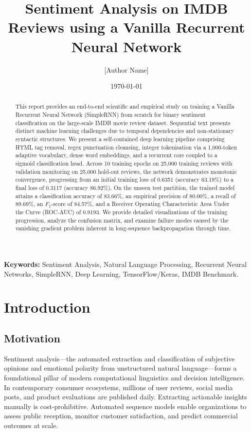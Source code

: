 \documentclass[11pt,a4paper]{article}
\title{\textbf{Sentiment Analysis on IMDB Reviews using a Vanilla Recurrent Neural Network}}
\author{[Author Name]}
\date{\today}
\begin{document}
\maketitle

\begin{abstract}
This report provides an end-to-end scientific and empirical study on training a Vanilla Recurrent Neural Network (SimpleRNN) from scratch for binary sentiment classification on the large-scale IMDB movie review dataset. Sequential text presents distinct machine learning challenges due to temporal dependencies and non-stationary syntactic structures. We present a self-contained deep learning pipeline comprising HTML tag removal, regex punctuation cleansing, integer tokenisation via a 1,000-token adaptive vocabulary, dense word embeddings, and a recurrent core coupled to a sigmoid classification head. Across 10 training epochs on 25,000 training reviews with validation monitoring on 25,000 hold-out reviews, the network demonstrates monotonic convergence, progressing from an initial training loss of 0.6351 (accuracy 63.19\%) to a final loss of 0.3117 (accuracy 86.92\%). On the unseen test partition, the trained model attains a classification accuracy of 83.66\%, an empirical precision of 80.00\%, a recall of 89.69\%, an $F_1$-score of 84.57\%, and a Receiver Operating Characteristic Area Under the Curve (ROC-AUC) of 0.9193. We provide detailed visualizations of the training progression, analyze the confusion matrix, and examine failure modes caused by the vanishing gradient problem inherent in long-sequence backpropagation through time.
\end{abstract}

\vspace{0.5em}
\noindent\textbf{Keywords:} Sentiment Analysis, Natural Language Processing, Recurrent Neural Networks, SimpleRNN, Deep Learning, TensorFlow/Keras, IMDB Benchmark.

\newpage
\tableofcontents
\newpage

\section{Introduction}

\subsection{Motivation}
Sentiment analysis—the automated extraction and classification of subjective opinions and emotional polarity from unstructured natural language—forms a foundational pillar of modern computational linguistics and decision intelligence. In contemporary consumer ecosystems, millions of user reviews, social media posts, and product evaluations are published daily. Extracting actionable insights manually is cost-prohibitive. Automated sequence models enable organizations to assess public reception, monitor customer satisfaction, and predict commercial outcomes at scale.
\end{document}
